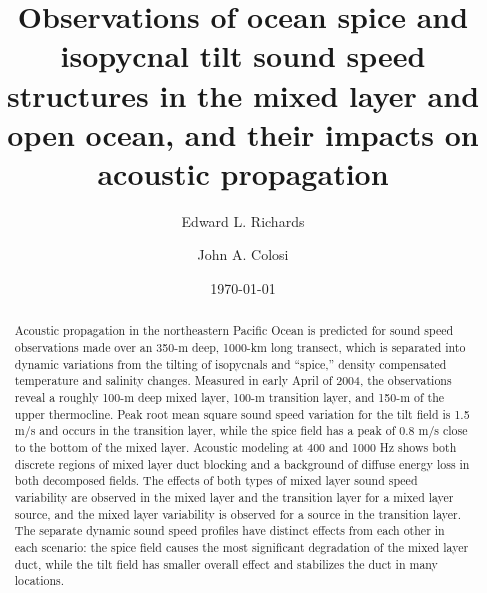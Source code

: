 \documentclass[preprint,NumberedRefs]{JASA}
\begin{document}
\title[Mixed layer tilt and spice]{Observations of ocean spice and isopycnal tilt sound speed structures in the mixed layer and open ocean, and their impacts on acoustic propagation}
\author{Edward L. Richards}
\author{John A. Colosi}


\date{\today}

\begin{abstract}
Acoustic propagation in the northeastern Pacific Ocean is predicted for sound speed observations made over an 350-m deep, 1000-km long transect, which is separated into dynamic variations from the tilting of isopycnals and “spice,” density compensated temperature and salinity changes. Measured in early April of 2004, the observations reveal a roughly 100-m deep mixed layer, 100-m transition layer, and 150-m of the upper thermocline. Peak root mean square sound speed variation for the tilt field is 1.5 m/s and occurs in the transition layer, while the spice field has a peak of 0.8 m/s close to the bottom of the mixed layer. Acoustic modeling at 400 and 1000 Hz shows both discrete regions of mixed layer duct blocking and a background of diffuse energy loss in both decomposed fields. The effects of both types of mixed layer sound speed variability are observed in the mixed layer and the transition layer for a mixed layer source, and the mixed layer variability is observed for a source in the transition layer. The separate dynamic sound speed profiles have distinct effects from each other in each scenario: the spice field causes the most significant degradation of the mixed layer duct, while the tilt field has smaller overall effect and stabilizes the duct in many locations.
\end{abstract}

\maketitle
\end{document}
